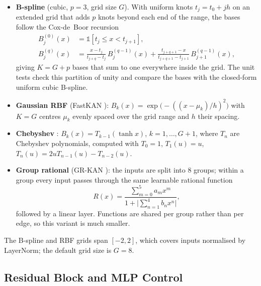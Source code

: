 \begin{itemize}
    \item \textbf{B-spline} (cubic, $p = 3$, grid size $G$). With uniform knots
          $t_j = t_0 + jh$ on an extended grid that adds $p$ knots beyond each end
          of the range, the bases follow the Cox-de~Boor recursion
          \begin{align}
          B^{(0)}_j(x) &= \mathbb{1}[t_j \le x < t_{j+1}], \\
          B^{(q)}_j(x) &= \frac{x - t_j}{t_{j+q} - t_j}\, B^{(q-1)}_j(x)
                       + \frac{t_{j+q+1} - x}{t_{j+q+1} - t_{j+1}}\, B^{(q-1)}_{j+1}(x),
          \end{align}
          giving $K = G + p$ bases that sum to one everywhere inside the grid.
          The unit tests check this partition of unity and compare the bases with
          the closed-form uniform cubic B-spline.
    \item \textbf{Gaussian RBF} (FastKAN \cite{li2024fastkan}):
          $B_k(x) = \exp\!\big(-((x - \mu_k)/h)^2\big)$ with $K = G$ centres
          $\mu_k$ evenly spaced over the grid range and $h$ their spacing.
    \item \textbf{Chebyshev} \cite{ss2024cheby}: $B_k(x) = T_{k-1}(\tanh x)$,
          $k = 1, \ldots, G+1$, where $T_n$ are Chebyshev polynomials,
          computed with $T_0 = 1$, $T_1(u) = u$, $T_{n}(u) = 2uT_{n-1}(u) - T_{n-2}(u)$.
    \item \textbf{Group rational} (GR-KAN \cite{yang2025kat}): the inputs are split
          into 8 groups; within a group every input passes through the same
          learnable rational function
          \begin{equation}
          R(x) = \frac{\sum_{m=0}^{5} a_m x^m}{1 + \big|\sum_{n=1}^{4} b_n x^n\big|},
          \end{equation}
          followed by a linear layer. Functions are shared per group rather than
          per edge, so this variant is much smaller.
\end{itemize}

The B-spline and RBF grids span $[-2, 2]$, which covers inputs normalised by
LayerNorm; the default grid size is $G = 8$.

\subsection{Residual Block and MLP Control}

